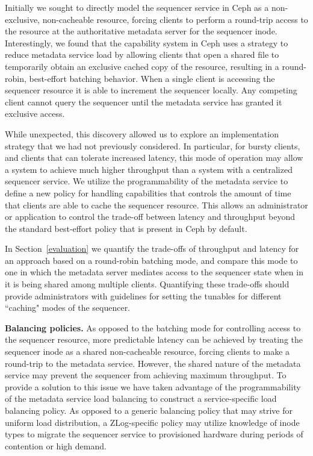 \documentclass[preprint]{sigplanconf-eurosys}
\begin{document}
Initially we sought to directly model the sequencer service in Ceph as a
non-exclusive, non-cacheable resource, forcing clients to perform a round-trip
access to the resource at the authoritative metadata server for the sequencer
inode.  Interestingly, we found that the capability system in Ceph uses a
strategy to reduce metadata service load by allowing clients that open a
shared file to temporarily obtain an exclusive cached copy of the resource,
resulting in a round-robin, best-effort batching behavior. When a single
client is accessing the sequencer resource it is able to increment the
sequencer locally. Any competing client cannot query the sequencer until the
metadata service has granted it exclusive access.

While unexpected, this discovery allowed us to explore an implementation
strategy that we had not previously considered. In particular, for bursty
clients, and clients that can tolerate increased latency, this mode of
operation may allow a system to achieve much higher throughput than a system
with a centralized sequencer service.  We utilize the programmability of the
metadata service to define a new policy for handling capabilities that controls
the amount of time that clients are able to cache the sequencer resource. This
allows an administrator or application to control the trade-off between latency
and throughput beyond the standard best-effort policy that is present in Ceph
by default. 

In Section~\ref{evaluation} we quantify the trade-offs of throughput and
latency for an approach based on a round-robin batching mode, and compare this
mode to one in which the metadata server mediates access to the sequencer state
when in it is being shared among multiple clients. Quantifying these trade-offs
should provide administrators with guidelines for setting the tunables for
different ``caching" modes of the sequencer.

{\bf Balancing policies.}
As opposed to the batching mode for controlling access to the sequencer
resource, more predictable latency can be achieved by treating the sequencer
inode as a shared non-cacheable resource, forcing clients to make a round-trip
to the metadata service. However, the shared nature of the metadata service
may prevent the sequencer from achieving maximum throughput. To provide a
solution to this issue we have taken advantage of the programmability of the
metadata service load balancing to construct a service-specific load balancing
policy. As opposed to a generic balancing policy that may strive for uniform
load distribution, a ZLog-specific policy may utilize knowledge of inode types
to migrate the sequencer service to provisioned hardware during periods of
contention or high demand.
\end{document}
